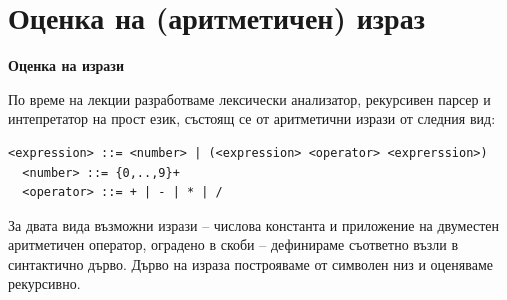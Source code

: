\section{Оценка на (аритметичен) израз}


\begin{mdframed}[hidealllines=true,backgroundcolor=gray!20]
\textbf{Оценка на изрази}


По време на лекции разработваме лексически анализатор, рекурсивен парсер и интепретатор на прост език, състоящ се от аритметични изрази от следния вид:
\begin{flushleft}
  \begin{lstlisting}[mathescape]
  <expression> ::= <number> | (<expression> <operator> <exprerssion>)
  <number> ::= {0,..,9}+
  <operator> ::= + | - | * | /
  \end{lstlisting}
\end{flushleft}

За двата вида възможни изрази -- числова константа и приложение на двуместен аритметичен оператор, оградено в скоби -- дефинираме съответно възли в синтактично дърво. Дърво на израза построяваме от символен низ и оценяваме рекурсивно.

\end{mdframed}


